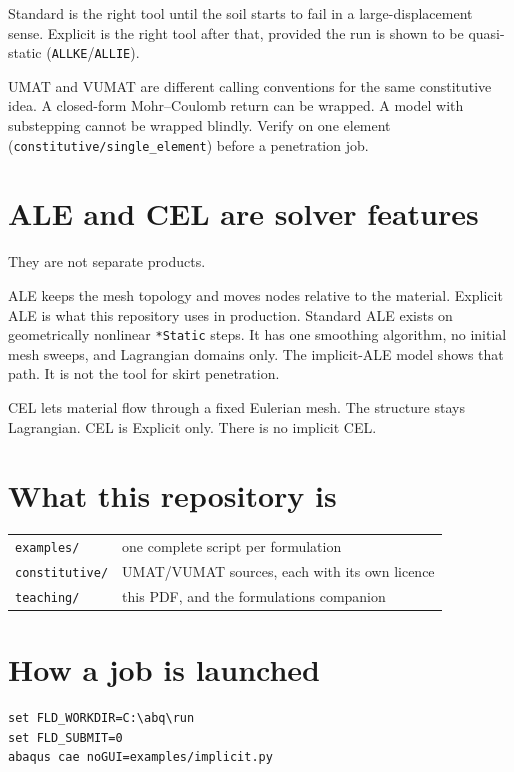 \documentclass[11pt,a4paper]{article}
\begin{document}
Standard is the right tool until the soil starts to fail in a large-displacement
sense. Explicit is the right tool after that, provided the run is shown to be
quasi-static (\texttt{ALLKE}/\texttt{ALLIE}).

UMAT and VUMAT are different calling conventions for the same constitutive
idea. A closed-form Mohr--Coulomb return can be wrapped. A model with
substepping cannot be wrapped blindly. Verify on one element
(\texttt{constitutive/single\_element}) before a penetration job.

\section{ALE and CEL are solver features}

They are not separate products.

ALE keeps the mesh topology and moves nodes relative to the material. Explicit
ALE is what this repository uses in production. Standard ALE exists on
geometrically nonlinear \texttt{*Static} steps. It has one smoothing algorithm,
no initial mesh sweeps, and Lagrangian domains only. The implicit-ALE model
shows that path. It is not the tool for skirt penetration.

CEL lets material flow through a fixed Eulerian mesh. The structure stays
Lagrangian. CEL is Explicit only. There is no implicit CEL.

\section{What this repository is}

\begin{center}
\small
\begin{tabular}{@{}lp{}@{}}
\toprule
\texttt{examples/} & one complete script per formulation \\
\texttt{constitutive/} & UMAT/VUMAT sources, each with its own licence \\
\texttt{teaching/} & this PDF, and the formulations companion \\
\bottomrule
\end{tabular}
\end{center}

\section{How a job is launched}

\begin{verbatim}
set FLD_WORKDIR=C:\abq\run
set FLD_SUBMIT=0
abaqus cae noGUI=examples/implicit.py
\end{verbatim}
\end{document}
